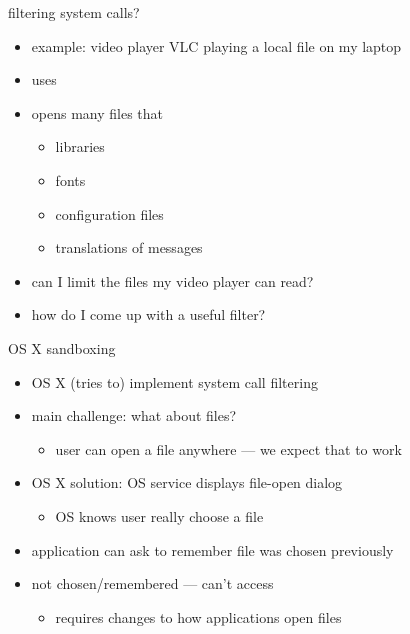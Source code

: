 \begin{frame}{filtering system calls?}
    \begin{itemize}
    \item example: video player VLC playing a local file on my laptop
    \item uses 
    \item opens many files that 
        \begin{itemize}
        \item libraries
        \item fonts
        \item configuration files
        \item translations of messages
        \end{itemize}
    \vspace{.5cm}
    \item can I limit the files my video player can read?
    \item how do I come up with a useful filter?
    \end{itemize}
\end{frame}

\begin{frame}{OS X sandboxing}
    \begin{itemize}
    \item OS X (tries to) implement system call filtering
    \item main challenge: what about files?
        \begin{itemize}
        \item user can open a file anywhere --- we expect that to work
        \end{itemize}
    \item<2> OS X solution: OS service displays file-open dialog
        \begin{itemize}
        \item OS knows user really choose a file
        \end{itemize}
    \item<2> application can ask to remember file was chosen previously
    \item<2> not chosen/remembered --- can't access
        \begin{itemize}
        \item requires changes to how applications open files
        \end{itemize}
    \end{itemize}
\end{frame}

